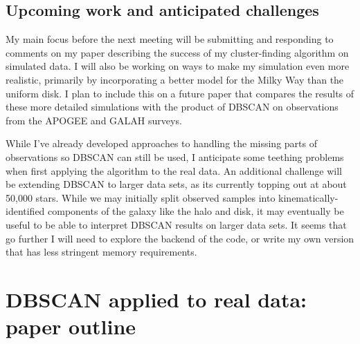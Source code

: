 \documentclass[11pt]{article}
\begin{document}
    
    \subsection*{Upcoming work and anticipated challenges}
    
    My main focus before the next meeting will be submitting and responding to comments on my paper describing the success of my cluster-finding algorithm on simulated data. I will also be working on ways to make my simulation even more realistic, primarily by incorporating a better model for the Milky Way than the uniform disk. I plan to include this on a future paper that compares the results of these more detailed simulations with the product of DBSCAN on observations from the APOGEE and GALAH surveys.
    
    While I've already developed approaches to handling the missing parts of observations so DBSCAN can still be used, I anticipate some teething problems when first applying the algorithm to the real data. An additional challenge will be extending DBSCAN to larger data sets, as its currently topping out at about 50,000 stars. While we may initially split observed samples into kinematically-identified components of the galaxy like the halo and disk, it may eventually be useful to be able to interpret DBSCAN results on larger data sets. It seems that go further I will need to explore the backend of the code, or write my own version that has less stringent memory requirements.
	
   
 
\section*{DBSCAN applied to real data: paper outline}
\end{document}
